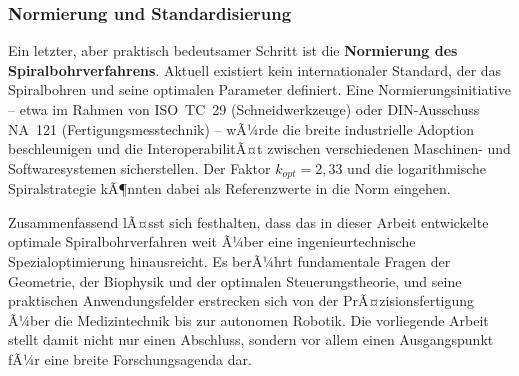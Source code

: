 ﻿\documentclass[12pt,a4paper]{article}
\begin{document}
\subsubsection{Normierung und Standardisierung}

Ein letzter, aber praktisch bedeutsamer Schritt ist die \textbf{Normierung des Spiralbohrverfahrens}. Aktuell existiert kein internationaler Standard, der das Spiralbohren und seine optimalen Parameter definiert. Eine Normierungsinitiative -- etwa im Rahmen von ISO~TC~29 (Schneidwerkzeuge) oder DIN-Ausschuss NA~121 (Fertigungsmesstechnik) -- wÃ¼rde die breite industrielle Adoption beschleunigen und die InteroperabilitÃ¤t zwischen verschiedenen Maschinen- und Softwaresystemen sicherstellen. Der Faktor $k_{opt} = 2{,}33$ und die logarithmische Spiralstrategie kÃ¶nnten dabei als Referenzwerte in die Norm eingehen.

\bigskip

Zusammenfassend lÃ¤sst sich festhalten, dass das in dieser Arbeit entwickelte optimale Spiralbohrverfahren weit Ã¼ber eine ingenieurtechnische Spezialoptimierung hinausreicht. Es berÃ¼hrt fundamentale Fragen der Geometrie, der Biophysik und der optimalen Steuerungstheorie, und seine praktischen Anwendungsfelder erstrecken sich von der PrÃ¤zisionsfertigung Ã¼ber die Medizintechnik bis zur autonomen Robotik. Die vorliegende Arbeit stellt damit nicht nur einen Abschluss, sondern vor allem einen Ausgangspunkt fÃ¼r eine breite Forschungsagenda dar.
\end{document}
